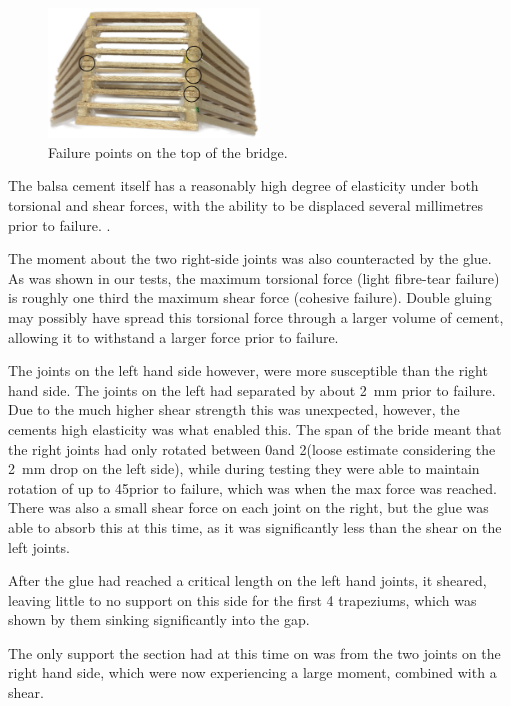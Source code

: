 \documentclass[12pt]{article}
\begin{document}
		\begin{figure}[h!]
			\centering
			\includegraphics[width=0.5\textwidth]{failtop}
			\caption{Failure points on the top of the bridge.}
			\label{failtop}
		\end{figure}

The balsa cement itself has a reasonably high degree of elasticity under both torsional and shear forces, with the ability to be displaced several millimetres prior to failure. \citep{glue}.

The moment about the two right-side joints was also counteracted by the glue. As was shown in our tests, the maximum torsional force (light fibre-tear failure) is roughly one third the maximum shear force (cohesive failure). Double gluing may possibly have spread this torsional force through a larger volume of cement, allowing it to withstand a larger force prior to failure. 

The joints on the left hand side however, were more susceptible than the right hand side. The joints on the left had separated by about 2~mm prior to failure. Due to the much higher shear strength this was unexpected, however, the cements high elasticity was what enabled this. The span of the bride meant that the right joints had only rotated between 0\textdegree and 2\textdegree (loose estimate considering the 2~mm drop on the left side), while during testing they were able to maintain rotation of up to 45\textdegree prior to failure, which was when the max force was reached. There was also a small shear force on each joint on the right, but the glue was able to absorb this at this time, as it was significantly less than the shear on the left joints.

After the glue had reached a critical length on the left hand joints, it sheared, leaving little to no support on this side for the first 4 trapeziums, which was shown by them sinking significantly into the gap.

The only support the section had at this time on was from the two joints on the right hand side, which were now experiencing a large moment, combined with a shear. 
\end{document}

